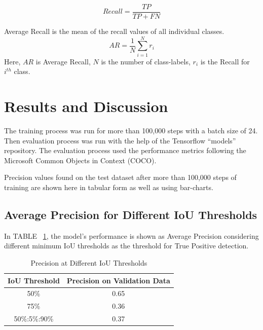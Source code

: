 \documentclass[conference]{IEEEtran}
\begin{document}
\begin{equation}   
  Recall = \frac{TP}{TP+FN}
\end{equation}
    
Average Recall is the mean of the recall values of all individual classes.
\begin{equation}
  AR = \frac{1}{N} \sum_{i=1}^N r_i
\end{equation}
Here, $AR$ is Average Recall, $N$ is the number of class-labels, $r_i$ is the Recall for $i^{th}$ class.
        
\section{Results and Discussion}
The training process was run for more than 100,000 steps with a batch size of 24. Then evaluation process was run with the help of the Tensorflow ``models'' repository. The evaluation process used the performance metrics following the Microsoft Common Objects in Context (COCO)\cite{lin2014microsoft}.
  
Precision values found on the test dataset after more than 100,000 steps of training are shown here in tabular form as well as using bar-charts.
  
\subsection{Average Precision for Different IoU Thresholds}
In TABLE ~\ref{tab:precision_iou}, the model's performance is shown as Average Precision considering different minimum IoU thresholds as the threshold for True Positive detection.
\begin{table}[h]
  \centering
  \caption{Precision at Different IoU Thresholds}
  \label{tab:precision_iou}
  \renewcommand{\arraystretch}{1.3}
  \begin{tabular}{c||c}
    \bfseries{IoU Threshold} & \bfseries{Precision on Validation Data} \\\hline\hline
    50\%                     & 0.65                                    \\\hline
    75\%                     & 0.36                                    \\\hline
    50\%:5\%:90\%            & 0.37                                    \\\hline
  \end{tabular}
\end{table}
  
\end{document}
